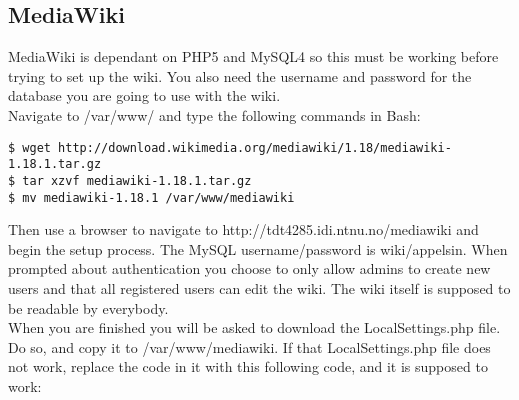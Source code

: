 \subsection {MediaWiki}
MediaWiki is dependant on PHP5 and MySQL4 so this must be working before trying to set up the wiki. You also need the username and password for the database you are going to use with the wiki.\\

Navigate to /var/www/ and type the following commands in Bash:
\begin{lstlisting}
$ wget http://download.wikimedia.org/mediawiki/1.18/mediawiki-1.18.1.tar.gz
$ tar xzvf mediawiki-1.18.1.tar.gz
$ mv mediawiki-1.18.1 /var/www/mediawiki
\end{lstlisting}

Then use a browser to navigate to http://tdt4285.idi.ntnu.no/mediawiki and begin the setup process. The MySQL username/password is wiki/appelsin. When prompted about authentication you choose to only allow admins to create new users and that all registered users can edit the wiki. The wiki itself is supposed to be readable by everybody. \\
When you are finished you will be asked to download the LocalSettings.php file. Do so, and copy it to /var/www/mediawiki. If that LocalSettings.php file does not work, replace the code in it with this following code, and it is supposed to work:

